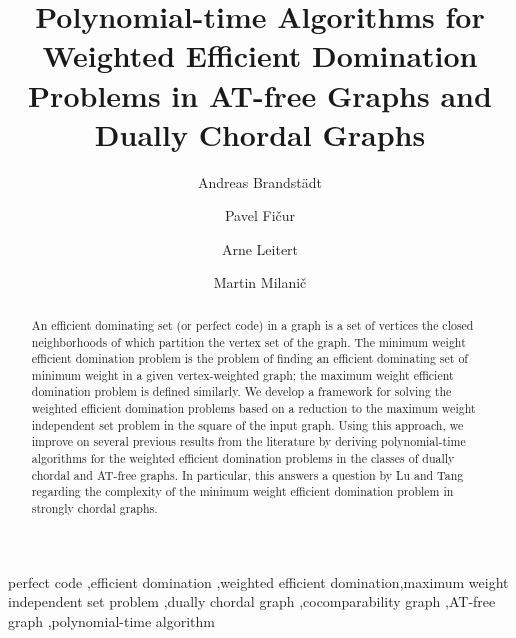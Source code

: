 \documentclass[]{elsarticle}
\begin{document}
\begin{frontmatter}
\title{Polynomial-time Algorithms for Weighted Efficient Domination Problems in AT-free Graphs and Dually Chordal Graphs}

\author[ROSTOCK]{Andreas Brandst\"adt}

\author[IAM,FAMNIT]{Pavel Fi\v cur}

\author[KENT]{Arne Leitert}

\author[IAM,FAMNIT]{Martin Milani\v c}

\address[ROSTOCK]{Institut f\"ur Informatik, Universit\"at Rostock, Germany}
\address[IAM]{University of Primorska, UP IAM, Muzejski trg 2, SI6000 Koper, Slovenia}
\address[FAMNIT]{University of Primorska, UP FAMNIT, Glagolja\v ska 8, SI6000 Koper, Slovenia}
\address[KENT]{Kent State University, Department of Computer Science, Kent, Ohio 44242, USA}


\begin{abstract}
An efficient dominating set (or perfect code) in a graph is a set of vertices the closed neighborhoods of which partition the vertex set of the graph.
The minimum weight efficient domination problem is the problem of finding an efficient dominating set of minimum weight in a given vertex-weighted graph;
the maximum weight efficient domination problem is defined similarly.
We develop a framework for solving the weighted efficient domination problems based on a reduction to the maximum weight independent set problem in the square of the input graph. 
Using this approach, we improve on several previous results from the literature by deriving polynomial-time algorithms for the weighted efficient domination problems in the classes of dually chordal and AT-free graphs. 
In particular, this answers a question by Lu and Tang regarding the complexity of the minimum weight efficient domination problem in strongly chordal graphs.
\end{abstract}

\begin{keyword}
perfect code \sep efficient domination \sep weighted efficient domination\sep maximum weight independent set problem
\sep dually chordal graph \sep cocomparability graph \sep AT-free graph  \sep polynomial-time algorithm
\end{keyword}
\end{frontmatter}
\end{document}
